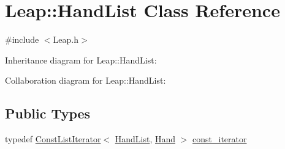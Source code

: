 \hypertarget{class_leap_1_1_hand_list}{}\section{Leap\+:\+:Hand\+List Class Reference}
\label{class_leap_1_1_hand_list}


{\ttfamily \#include $<$Leap.\+h$>$}



Inheritance diagram for Leap\+:\+:Hand\+List\+:


Collaboration diagram for Leap\+:\+:Hand\+List\+:
\subsection*{Public Types}
\begin{DoxyCompactItemize}
\item 
typedef \hyperlink{class_leap_1_1_const_list_iterator}{Const\+List\+Iterator}$<$ \hyperlink{class_leap_1_1_hand_list}{Hand\+List}, \hyperlink{class_leap_1_1_hand}{Hand} $>$ \hyperlink{class_leap_1_1_hand_list_a9c35a4db8fd94a3b1a029efecbd13668}{const\+\_\+iterator}
\end{DoxyCompactItemize}
